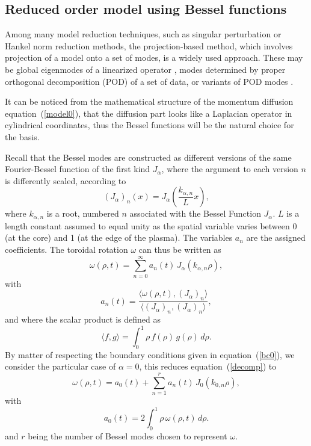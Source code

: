 \documentclass[12pt]{iopart}
\begin{document}
\subsection{Reduced order model using Bessel functions}

Among many model reduction techniques, such as singular perturbation or Hankel norm reduction methods, the projection-based method, which involves projection of a model onto a set of modes, is a widely used approach. These may be global eigenmodes of a linearized operator \cite{Akervik07}, modes determined by proper orthogonal decomposition (POD) of a set of data, or variants of POD modes \cite{Holmes97}. 

It can be noticed from the mathematical structure of the momentum diffusion equation~(\ref{model0}), that the diffusion part looks like a Laplacian operator in cylindrical coordinates, thus the Bessel functions will be the natural choice for the basis. 

Recall that the Bessel modes are constructed as different versions of the same Fourier-Bessel function of the first kind $J_{\alpha}$, where the argument to each version $n$ is differently scaled, according to
\begin{equation}
(J_{\alpha})_n (x) = J_{\alpha} \left(  \frac{ k_{\alpha,n}}{L} x \right),
\label{defmod}
\end{equation}
where $ k_{\alpha,n}$ is a root, numbered $n$ associated with the Bessel Function $J_{\alpha}$. $L$ is a length constant assumed to equal unity as the spatial variable varies between 0 (at the core) and 1 (at the edge of the plasma). The variables $a_n$ are the assigned coefficients. The toroidal rotation $\omega$ can thus be written as 
\begin{equation}
\omega(\rho,t)  = \sum_{n=0}^{\infty} a_n(t) \, J_{\alpha} \left( { k_{\alpha,n}} \rho \right),
\label{decomp}
\end{equation}
 with
 \begin{equation}
a_n(t) = \frac{\langle \omega(\rho,t), \left(J_{\alpha} \right)_n \rangle }{\langle  \left(J_{\alpha} \right)_n ,  \left(J_{\alpha} \right)_n   \rangle},
\end{equation}
and where the scalar product is defined as 
\begin{equation}
\langle f,g \rangle =   \int^1 _0 \rho \, f(\rho) \, g(\rho) \, d\rho.
\end{equation}
By matter of respecting the boundary conditions given in equation~(\ref{bc0}), we consider the particular case of $\alpha = 0$, this reduces equation~(\ref{decomp}) to
\begin{equation}
\omega(\rho,t)  = a_0(t) + \sum_{n=1}^{r} a_n(t) \, J_{0} \left(  k_{0,n} \rho \right),
\end{equation}
with
\begin{equation}
a_0 (t) = {2} \int^1 _0 \rho \, \omega(\rho,t) \, d\rho.
\end{equation}
and $r$ being the number of Bessel modes chosen to represent $\omega$.
\end{document}
